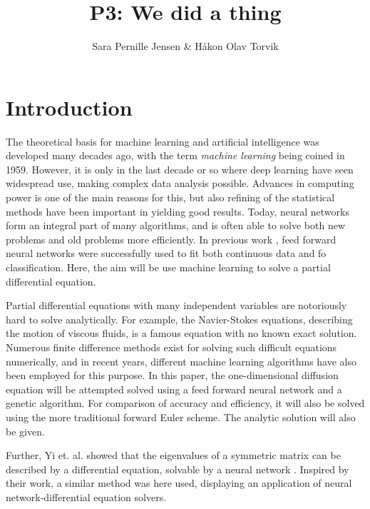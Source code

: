 \documentclass[multicolumn, 9pt]{extarticle}
\author{\Large Sara Pernille Jensen \& Håkon Olav Torvik}
\title{\Huge P3: We did a thing}
\affiliation{\large FYS-STK4155 – Applied Data Analysis and Machine Learning
\\Autumn 2021\\Department of Physics\\University of Oslo\\\\\today}
\begin{document}



\maketitle

\pagestyle{myplain}


\twocolumn
\section{Introduction}

The theoretical basis for machine learning and artificial intelligence was developed many decades ago, with the term \textit{machine learning} being coined in 1959. However, it is only in the last decade or so where deep learning have seen widespread use, making complex data analysis possible. Advances in computing power is one of the main reasons for this, but also refining of the statistical methods have been important in yielding good results. Today, neural networks form an integral part of many algorithms, and is often able to solve both new problems and old problems more efficiently. In previous work \cite{p2S} \cite{p2HO}, feed forward neural networks were successfully used to fit both continuous data and fo classification. Here, the aim will be use machine learning to solve a partial differential equation.

Partial differential equations with many independent variables are notoriously hard to solve analytically. For example, the Navier-Stokes equations, describing the motion of viscous fluids, is a famous equation with no known exact solution. Numerous finite difference methods exist for solving such difficult equations numerically, and in recent years, different machine learning algorithms have also been employed for this purpose. In this paper, the one-dimensional diffusion equation will be attempted solved using a feed forward neural network and a genetic algorithm. For comparison of accuracy and efficiency, it will also be solved using the more traditional forward Euler scheme. The analytic solution will also be given.

Further, Yi et. al. showed that the eigenvalues of a symmetric matrix can be described by a differential equation, solvable by a neural network \cite{symmetric}. Inspired by their work, a similar method was here used, displaying an application of neural network-differential equation solvers.
\end{document}

